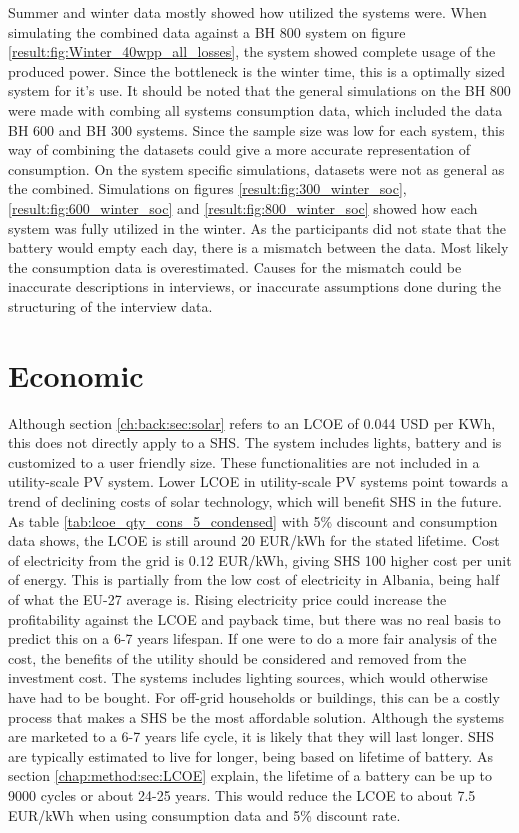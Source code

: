 Summer and winter data mostly showed how utilized the systems were. When simulating the combined data against a BH 800 system on figure \ref{result:fig:Winter_40wpp_all_losses}, the system showed complete usage of the produced power. Since the bottleneck is the winter time, this is a optimally sized system for it's use. It should be noted that the general simulations on the BH 800 were made with combing all systems consumption data, which included the data BH 600 and BH 300 systems. Since the sample size was low for each system, this way of combining the datasets could give a more accurate representation of consumption. On the system specific simulations, datasets were not as general as the combined. Simulations on figures \ref{result:fig:300_winter_soc}, \ref{result:fig:600_winter_soc} and \ref{result:fig:800_winter_soc} showed how each system was fully utilized in the winter. As the participants did not state that the battery would empty each day, there is a mismatch between the data. Most likely the consumption data is overestimated. Causes for the mismatch could be inaccurate descriptions in interviews, or inaccurate assumptions done during the structuring of the interview data.  


\section{Economic}
Although section \ref{ch:back:sec:solar} refers to an LCOE of 0.044 USD per KWh, this does not directly apply to a SHS. The system includes lights, battery and is customized to a user friendly size. These functionalities are not included in a utility-scale PV system. Lower LCOE in utility-scale PV systems point towards a trend of declining costs of solar technology, which will benefit SHS in the future. As table \ref{tab:lcoe_qty_cons_5_condensed} with 5\% discount and consumption data shows, the LCOE is still around 20 EUR/kWh for the stated lifetime. Cost of electricity from the grid is 0.12 EUR/kWh, giving SHS 100 higher cost per unit of energy. This is partially from the low cost of electricity in Albania, being half of what the EU-27 average is. Rising electricity price could increase the profitability against the LCOE and payback time, but there was no real basis to predict this on a 6-7 years lifespan.  If one were to do a more fair analysis of the cost, the benefits of the utility should be considered and removed from the investment cost. The systems includes lighting sources, which would otherwise have had to be bought. For off-grid households or buildings, this can be a costly process that makes a SHS be the most affordable solution. Although the systems are marketed to a 6-7 years life cycle, it is likely that they will last longer. SHS are typically estimated to live for longer, being based on lifetime of battery. As section \ref{chap:method:sec:LCOE} explain, the lifetime of a battery can be up to 9000 cycles or about 24-25 years. This would reduce the LCOE to about 7.5 EUR/kWh when using consumption data and 5\% discount rate. 

